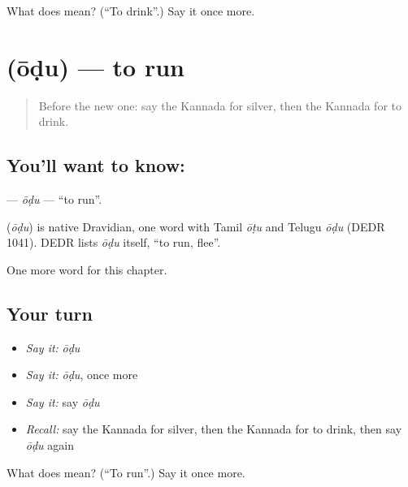 \begin{tcolorbox}[breakable,colback=teal!4,colframe=teal!35!black,title={Before you move on}]
What does  mean? (\textquotedblleft{}To drink\textquotedblright{}.) Say it once more.
\end{tcolorbox}
\section[\texorpdfstring{\kn{ಓಡು} (ōḍu)}{ಓಡು (ōḍu)}]{ (ōḍu) — to run}

\label{lesson:KA-C147-odu}



\begin{quote}
Before the new one: say the Kannada for silver, then the Kannada for to drink.
\end{quote}

\subsection*{You'll want to know: }
\textbf{} — \emph{ōḍu} — \textquotedblleft{}to run\textquotedblright{}.

\begin{cousinweb}
\textbf{} (\emph{ōḍu}) is native Dravidian, one word with Tamil \emph{ōṭu} and Telugu \emph{ōḍu} (DEDR 1041). DEDR lists \emph{ōḍu} itself, \textquotedblleft{}to run, flee\textquotedblright{}.
\end{cousinweb}

\begin{grammarlens}[title={What you've built}]
One more word for this chapter.
\end{grammarlens}

\subsection*{Your turn}
\begin{itemize}
\raggedright
  \item \emph{Say it:} \emph{ōḍu}
  \item \emph{Say it:} \emph{ōḍu}, once more
  \item \emph{Say it:} say \emph{ōḍu}
  \item \emph{Recall:} say the Kannada for silver, then the Kannada for to drink, then say \emph{ōḍu} again
\end{itemize}

\begin{tcolorbox}[breakable,colback=teal!4,colframe=teal!35!black,title={Before you move on}]
What does  mean? (\textquotedblleft{}To run\textquotedblright{}.) Say it once more.
\end{tcolorbox}
